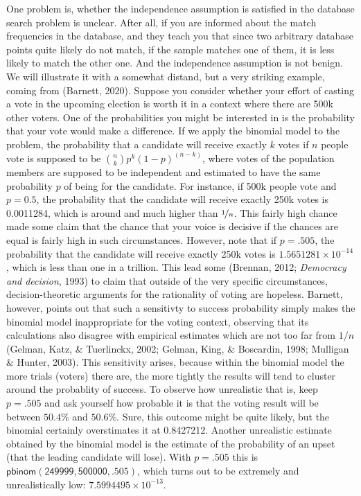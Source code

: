 \documentclass[
  10pt,
  dvipsnames,enabledeprecatedfontcommands]{scrartcl}
\begin{document}
One problem is, whether the independence assumption is satisfied in the
database search problem is unclear. After all, if you are informed about
the match frequencies in the database, and they teach you that since two
arbitrary database points quite likely do not match, if the sample
matches one of them, it is less likely to match the other one. And the
independence assumption is not benign. We will illustrate it with a
somewhat distand, but a very striking example, coming from (Barnett,
2020). Suppose you consider whether your effort of casting a vote in the
upcoming election is worth it in a context where there are 500k other
voters. One of the probabilities you might be interested in is the
probability that your vote would make a difference. If we apply the
binomial model to the problem, the probability that a candidate will
receive exactly \(k\) votes if \(n\) people vote is supposed to be
\({n \choose k} p^{k} (1-p)^{(n-k)}\), where votes of the population
members are supposed to be independent and estimated to have the same
probability \(p\) of being for the candidate. For instance, if 500k
people vote and \(p= 0.5\), the probability that the candidate will
receive exactly 250k votes is 0.0011284, which is around
 and much higher than \(\nicefrac{1}{n}\). This fairly
high chance made some claim that the chance that your voice is decisive
if the chances are equal is fairly high in such circumstances. However,
note that if \(p=.505\), the probability that the candidate will receive
exactly 250k votes is \ensuremath{1.5651281\times 10^{-14}}, which is
less than one in a trillion. This lead some (Brennan, 2012;
\emph{Democracy and decision}, 1993) to claim that outside of the very
specific circumstances, decision-theoretic arguments for the rationality
of voting are hopeless. Barnett, however, points out that such a
sensitivty to success probability simply makes the binomial model
inappropriate for the voting context, observing that its calculations
also disagree with empirical estimates which are not too far from
\(1/n\) (Gelman, Katz, \& Tuerlinckx, 2002; Gelman, King, \& Boscardin,
1998; Mulligan \& Hunter, 2003). This sensitivity arises, because within
the binomial model the more trials (voters) there are, the more tightly
the results will tend to cluster around the probablity of success. To
observe how unrealistic that is, keep \(p=.505\) and ask yourself how
probable it is that the voting result will be between \(50.4\%\) and
\(50.6\%\). Sure, this outcome might be quite likely, but the binomial
certainly overstimates it at 0.8427212. Another unrealistic estimate
obtained by the binomial model is the estimate of the probability of an
upset (that the leading candidate will lose). With \(p=.505\) this is
\(\mathsf{pbinom(249999,500000,.505)}\), which turns out to be extremely
and unrealistically low: \ensuremath{7.5994495\times 10^{-13}}.
\end{document}
